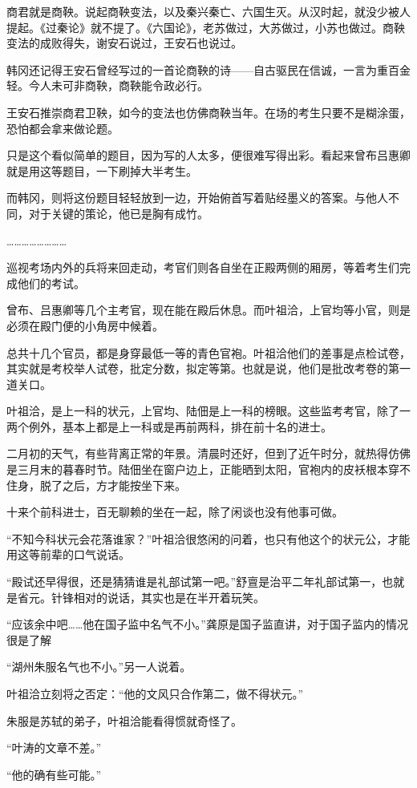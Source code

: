 商君就是商鞅。说起商鞅变法，以及秦兴秦亡、六国生灭。从汉时起，就没少被人提起。《过秦论》就不提了。《六国论》，老苏做过，大苏做过，小苏也做过。商鞅变法的成败得失，谢安石说过，王安石也说过。

韩冈还记得王安石曾经写过的一首论商鞅的诗——自古驱民在信诚，一言为重百金轻。今人未可非商鞅，商鞅能令政必行。

王安石推崇商君卫鞅，如今的变法也仿佛商鞅当年。在场的考生只要不是糊涂蛋，恐怕都会拿来做论题。

只是这个看似简单的题目，因为写的人太多，便很难写得出彩。看起来曾布吕惠卿就是用这等题目，一下刷掉大半考生。

而韩冈，则将这份题目轻轻放到一边，开始俯首写着贴经墨义的答案。与他人不同，对于关键的策论，他已是胸有成竹。

……………………

巡视考场内外的兵将来回走动，考官们则各自坐在正殿两侧的厢房，等着考生们完成他们的考试。

曾布、吕惠卿等几个主考官，现在能在殿后休息。而叶祖洽，上官均等小官，则是必须在殿门便的小角房中候着。

总共十几个官员，都是身穿最低一等的青色官袍。叶祖洽他们的差事是点检试卷，其实就是考校举人试卷，批定分数，拟定等第。也就是说，他们是批改考卷的第一道关口。

叶祖洽，是上一科的状元，上官均、陆佃是上一科的榜眼。这些监考考官，除了一两个例外，基本上都是上一科或是再前两科，排在前十名的进士。

二月初的天气，有些背离正常的年景。清晨时还好，但到了近午时分，就热得仿佛是三月末的暮春时节。陆佃坐在窗户边上，正能晒到太阳，官袍内的皮袄根本穿不住身，脱了之后，方才能按坐下来。

十来个前科进士，百无聊赖的坐在一起，除了闲谈也没有他事可做。

“不知今科状元会花落谁家？”叶祖洽很悠闲的问着，也只有他这个的状元公，才能用这等前辈的口气说话。

“殿试还早得很，还是猜猜谁是礼部试第一吧。”舒亶是治平二年礼部试第一，也就是省元。针锋相对的说话，其实也是在半开着玩笑。

“应该余中吧……他在国子监中名气不小。”龚原是国子监直讲，对于国子监内的情况很是了解

“湖州朱服名气也不小。”另一人说着。

叶祖洽立刻将之否定：“他的文风只合作第二，做不得状元。”

朱服是苏轼的弟子，叶祖洽能看得惯就奇怪了。

“叶涛的文章不差。”

“他的确有些可能。”

